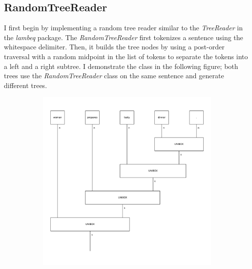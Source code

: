 \documentclass[12pt ]{article}
\begin{document}
\subsection{RandomTreeReader}
I first begin by implementing a random tree reader similar to the {\it TreeReader} in the {\it lambeq} package. The {\it RandomTreeReader} first tokenizes a sentence using the whitespace delimiter. Then, it builds the tree nodes by using a post-order traversal with a random midpoint in the list of tokens to separate the tokens into a left and a right subtree. I demonstrate the class in the following figure; both trees use the {\it RandomTreeReader} class on the same sentence and generate different trees.
\begin{figure}[t!]
    \centering
    \begin{subfigure}[t]{0.5\textwidth}
        \centering
        \includegraphics[width=\textwidth]{../test/output/random_1.pdf}
    \end{subfigure}%
    ~ 
    \begin{subfigure}[t]{0.5\textwidth}
        \centering

\end{subfigure}
\end{figure}
\end{document}
